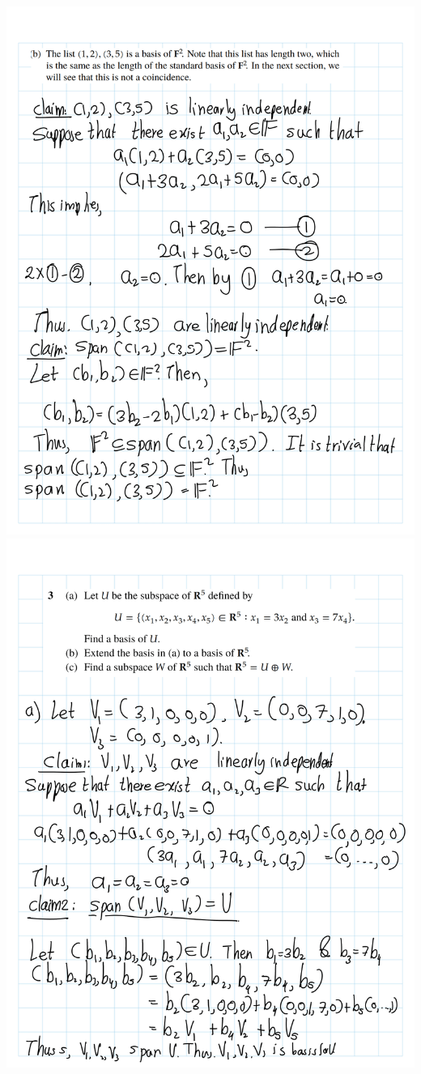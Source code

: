 \documentclass[
]{book}
\theoremstyle{definition}
\theoremstyle{definition}
\theoremstyle{definition}
\theoremstyle{definition}
\theoremstyle{remark}
\begin{document}
\includegraphics{fig/Ex 2B and 2C/EX2B (5).png}
\includegraphics{fig/Ex 2B and 2C/EX2B (6).png}
\end{document}
